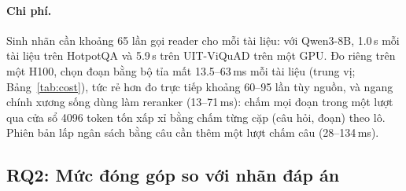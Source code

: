 \documentclass[11pt]{article}
\begin{document}
\paragraph{Chi phí.} Sinh nhãn cần khoảng 65 lần gọi reader cho mỗi tài liệu: với Qwen3-8B, 1.0\,s mỗi tài
liệu trên HotpotQA và 5.9\,s trên UIT-ViQuAD trên một GPU. Đo riêng trên một H100, chọn đoạn bằng bộ tỉa mất
13.5--63\,ms mỗi tài liệu (trung vị; Bảng~\ref{tab:cost}), tức rẻ hơn đo trực tiếp khoảng 60--95 lần tùy nguồn,
và ngang chính xương sống dùng làm reranker (13--71\,ms): chấm mọi đoạn trong một lượt qua cửa sổ 4096 token tốn
xấp xỉ bằng chấm từng cặp (câu hỏi, đoạn) theo lô. Phiên bản lấp ngân sách bằng câu cần thêm một lượt chấm câu
(28--134\,ms).

\subsection{RQ2: Mức đóng góp so với nhãn đáp án}
\end{document}
